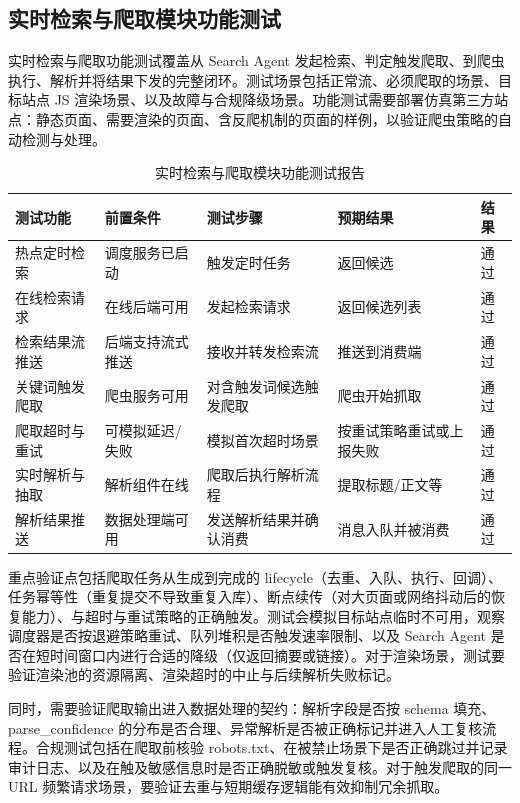 \subsection{实时检索与爬取模块功能测试}
实时检索与爬取功能测试覆盖从 Search Agent 发起检索、判定触发爬取、到爬虫执行、解析并将结果下发的完整闭环。测试场景包括正常流、必须爬取的场景、目标站点 JS 渲染场景、以及故障与合规降级场景。功能测试需要部署仿真第三方站点：静态页面、需要渲染的页面、含反爬机制的页面的样例，以验证爬虫策略的自动检测与处理。
\begin{table}[htb]
\centering
\caption{实时检索与爬取模块功能测试报告}
\label{tab:realtime-retrieval-test-brief}
{\renewcommand{\arraystretch}{1.2}
\begin{tabular}{p{2.5cm} p{3cm} p{2cm} p{3.5cm} p{1cm}}
\hline
测试功能 & 前置条件 & 测试步骤 & 预期结果 & 结果 \\
\hline
热点定时检索 & 调度服务已启动 & 触发定时任务 & 返回候选 & 通过 \\\hline
在线检索请求 & 在线后端可用 & 发起检索请求 & 返回候选列表 & 通过 \\\hline
检索结果流推送 & 后端支持流式推送 & 接收并转发检索流 & 推送到消费端 & 通过 \\\hline
关键词触发爬取 & 爬虫服务可用 & 对含触发词候选触发爬取 & 爬虫开始抓取 & 通过 \\\hline
爬取超时与重试 & 可模拟延迟/失败 & 模拟首次超时场景 & 按重试策略重试或上报失败 & 通过 \\\hline
实时解析与抽取 & 解析组件在线 & 爬取后执行解析流程 & 提取标题/正文等 & 通过 \\\hline
解析结果推送 & 数据处理端可用 & 发送解析结果并确认消费 & 消息入队并被消费 & 通过 \\\hline
\end{tabular}
}
\end{table}
重点验证点包括爬取任务从生成到完成的 lifecycle（去重、入队、执行、回调）、任务幂等性（重复提交不导致重复入库）、断点续传（对大页面或网络抖动后的恢复能力）、与超时与重试策略的正确触发。测试会模拟目标站点临时不可用，观察调度器是否按退避策略重试、队列堆积是否触发速率限制、以及 Search Agent 是否在短时间窗口内进行合适的降级（仅返回摘要或链接）。对于渲染场景，测试要验证渲染池的资源隔离、渲染超时的中止与后续解析失败标记。

同时，需要验证爬取输出进入数据处理的契约：解析字段是否按 schema 填充、parse\_confidence 的分布是否合理、异常解析是否被正确标记并进入人工复核流程。合规测试包括在爬取前核验 robots.txt、在被禁止场景下是否正确跳过并记录审计日志、以及在触及敏感信息时是否正确脱敏或触发复核。对于触发爬取的同一 URL 频繁请求场景，要验证去重与短期缓存逻辑能有效抑制冗余抓取。
